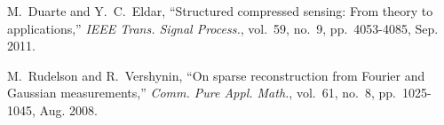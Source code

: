 \documentclass[journal]{IEEEtran}
\numberwithin{const2}{const}
\begin{document}
\begin{thebibliography}{1}
	
	

	

%	
%	
%	
%	
%    


	
	M.~Duarte and Y.~C.~Eldar,
	``Structured compressed sensing: From theory to applications,''
	\emph{IEEE Trans. Signal Process.}, vol.~59, no.~9, pp.~4053-4085, Sep. 2011.	
	
	
%	
	
	
	M.~Rudelson and R.~Vershynin,
	``On sparse reconstruction from Fourier and Gaussian measurements,''
	\emph{Comm. Pure Appl. Math.}, vol.~61, no.~8, pp.~1025-1045, Aug. 2008.
		
	


\end{thebibliography}
\end{document}
